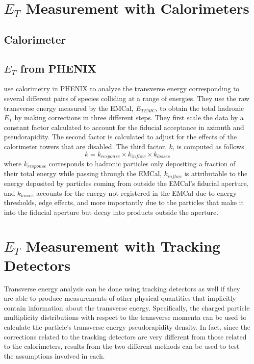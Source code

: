 \section{$E_{T}$ Measurement with Calorimeters}
\subsection{Calorimeter}
\subsection{$E_{T}$ from PHENIX}
\citet{PhysRevC.93.024901} use calorimetry in PHENIX to analyze the transverse energy corresponding to several different pairs of species colliding at a range of energies. They use the raw transverse energy measured by the EMCal, $E_{{T}EMC}$, to obtain the total hadronic $E_{T}$ by making corrections in three different steps. They first scale the data by a constant factor calculated to account for the fiducial acceptance in azimuth and pseudorapidity. The second factor is calculated to adjust for the effects of the calorimeter towers that are disabled. The third factor, $k$, is computed as follows
\begin{equation}\label{eqn:AdareKfactor}
k = k_{response} \times k_{inflow} \times k_{losses}
\end{equation}
where $k_{response}$ corresponds to hadronic particles only depositing a fraction of their total energy while passing through the EMCal, $k_{inflow}$ is attributable to the energy deposited by particles coming from outside the EMCal's fiducial aperture, and $k_{losses}$ accounts for the energy not registered in the EMCal due to energy thresholds, edge effects, and more importantly due to the particles that make it into the fiducial aperture but decay into products outside the aperture.

\section{$E_{T}$ Measurement with Tracking Detectors}
Transverse energy analysis can be done using tracking detectors as well if they are able to produce measurements of other physical quantities that implicitly contain information about the transverse energy. Specifically, the charged particle multiplicity distributions with respect to the transverse momenta can be used to calculate the particle's transverse energy pseudorapidity density. In fact, since the corrections related to the tracking detectors are very different from those related to the calorimeters, results from the two different methods can be used to test the assumptions involved in each.

